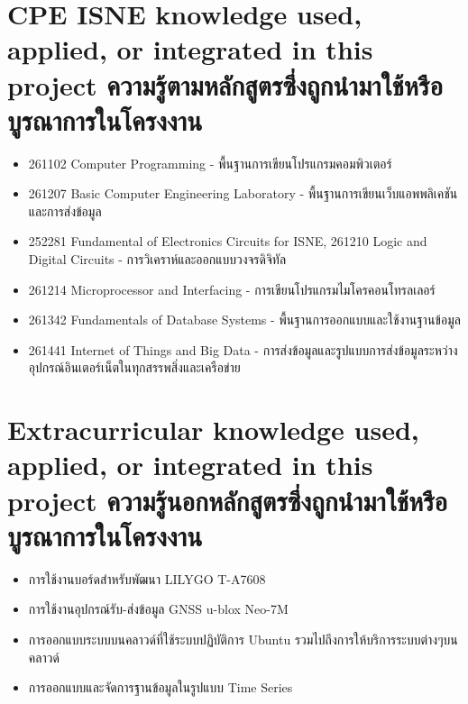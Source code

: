 \section{\ifenglish%
\ifcpe CPE \else ISNE \fi knowledge used, applied, or integrated in this project
\else%
ความรู้ตามหลักสูตรซึ่งถูกนำมาใช้หรือบูรณาการในโครงงาน
\fi
}
\begin{itemize}
  \item 261102 Computer Programming - พื้นฐานการเขียนโปรแกรมคอมพิวเตอร์
  \item 261207 Basic Computer Engineering Laboratory - พื้นฐานการเขียนเว็บแอพพลิเคชันและการส่งข้อมูล
  \item 252281 Fundamental of Electronics Circuits for ISNE, 261210 Logic and Digital Circuits - การวิเคราห์และออกแบบวงจรดิจิทัล
  \item 261214 Microprocessor and Interfacing - การเขียนโปรแกรมไมโครคอนโทรลเลอร์
  \item 261342 Fundamentals of Database Systems - พื้นฐานการออกแบบและใช้งานฐานข้อมูล
  \item 261441 Internet of Things and Big Data - การส่งข้อมูลและรูปแบบการส่งข้อมูลระหว่างอุปกรณ์อินเตอร์เน็ตในทุกสรรพสิ่งและเครือข่าย
\end{itemize}

\section{\ifenglish%
Extracurricular knowledge used, applied, or integrated in this project
\else%
ความรู้นอกหลักสูตรซึ่งถูกนำมาใช้หรือบูรณาการในโครงงาน
\fi
}
\begin{itemize}
  \item การใช้งานบอร์ดสำหรับพัฒนา LILYGO T-A7608
  \item การใช้งานอุปกรณ์รับ-ส่งข้อมูล GNSS u-blox Neo-7M
  \item การออกแบบระบบบนคลาวด์ที่ใช้ระบบปฏิบัติการ Ubuntu รวมไปถึงการให้บริการระบบต่างๆบนคลาวด์
  \item การออกแบบและจัดการฐานข้อมูลในรูปแบบ Time Series
\end{itemize}